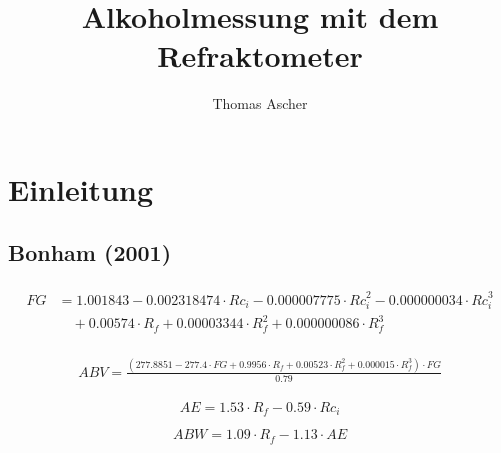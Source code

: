 \documentclass[a4paper,parskip=half]{scrartcl}
\title{Alkoholmessung mit dem Refraktometer}
\author{Thomas Ascher}
\begin{document}
\maketitle

\section*{Einleitung}

\autocite{Terrill2013}
\autocite{Novotny2017}
\autocite{Novotny2017a}
\autocite{Bonham2001}
\autocite{Gossett2012}
\autocite{Gossett2012a}
\autocite{Gossett2012b}
\autocite{Gossett2012c}
\autocite{Troester2012}
\autocite{Terrill2010}
\autocite{Terrill2010a}
\autocite{Terrill2011}
\autocite{Siebel1938}
\autocite{Weiss2016}
\autocite{BrewersJournal2017}
\autocite{Annemueller2015}
\autocite{Kunze2004}

\newcommand{\rii}{\mathit{R}_i}
\newcommand{\riic}{\mathit{Rc}_i}
\newcommand{\rif}{\mathit{R}_f}
\newcommand{\rifc}{\mathit{Rc}_f}
\newcommand{\fg}{\mathit{FG}}
\newcommand{\abv}{\mathit{ABV}}
\newcommand{\abw}{\mathit{ABW}}

\subsection*{Bonham (2001)}

\begin{align}
\begin{split}
\fg &= 1.001843 - 0.002318474 \cdot \riic - 0.000007775 \cdot \riic^2 -
0.000000034 \cdot \riic^3 \\
& \quad + 0.00574 \cdot \rif +
0.00003344 \cdot \rif^2 + 0.000000086 \cdot \rif^3
\end{split} \label{eq:bonham} 
\end{align}

\begin{align}
\begin{split}
\abv = \frac{(277.8851 - 277.4 \cdot \fg + 0.9956 \cdot \rif + 0.00523 \cdot \rif^2 + 0.000015 \cdot \rif^3) \cdot \fg}{0.79}
\end{split}
\end{align}

\begin{equation}
\mathit{AE}=1.53 \cdot \rif - 0.59 \cdot \riic
\label{eq:gardner} 
\end{equation}

\begin{equation}
\abw = 1.09 \cdot \rif - 1.13 \cdot \mathit{AE}
\end{equation}
\end{document}
